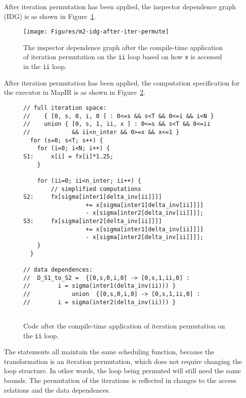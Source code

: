 \documentclass{article}
\begin{document}
After iteration permutation has been applied, the inspector dependence graph (IDG) is as shown in 
Figure~\ref{fig:afterIterPermute}.
\begin{figure}[h!]
\texttt{[image: Figures/m2-idg-after-iter-permute]}
\caption{The inspector dependence graph after the compile-time application of iteration permutation on the
{\tt ii} loop based on how {\tt x} is accessed in the {\tt ii} loop.}
\label{fig:afterIterPermute}
\end{figure}

	
After iteration permutation has been applied, the computation specification for the executor in MapIR is as shown
in Figure~\ref{fig:codeAfterIter}.

\begin{figure}
\begin{verbatim}
// full iteration space:
//    { [0, s, 0, i, 0 ] : 0<=s && s<T && 0<=i && i<N }
//    union { [0, s, 1, ii, x ] : 0<=s && s<T && 0<=ii 
//            && ii<n_inter && 0>=x && x<=1 }
  for (s=0; s<T; s++) {
    for (i=0; i<N; i++) {
S1:     x[i] = fx[i]*1.25;
    }

    for (ii=0; ii<n_inter; ii++) {
        // simplified computations
S2:     fx[sigma[inter1[delta_inv[ii]]]] 
                  += x[sigma[inter1[delta_inv[ii]]]] 
                  - x[sigma[inter2[delta_inv[ii]]]]; 
S3:     fx[sigma[inter2[delta_inv[ii]]]] 
                  += x[sigma[inter1[delta_inv[ii]]]] 
                  - x[sigma[inter2[delta_inv[ii]]]]; 
    }
  }

// data dependences:
//  D_S1_to_S2 =  {[0,s,0,i,0] -> [0,s,1,ii,0] : 
//        i = sigma(inter1(delta_inv(ii))) }
//            union  {[0,s,0,i,0] -> [0,s,1,ii,0] : 
//        i = sigma(inter2(delta_inv(ii))) }
  
\end{verbatim}
\caption{Code after the compile-time application of iteration permutation on the
{\tt ii} loop.}
\label{fig:codeAfterIter}
\end{figure}

The statements all maintain the same scheduling function, because the transformation is an iteration 
permutation, which does not require changing the loop structure.  In other words, the loop being permuted
will still need the same bounds.  The permutation of the iterations is reflected in changes to the access relations and the data dependences.
\end{document}
